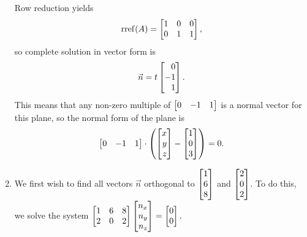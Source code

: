 \begin{exercises}
\begin{problist}
\begin{solution}
\begin{enumerate}
\[					\]
					Row reduction yields
					\[
						\Rref(A) = \mat{1&0&0\\0&1&1},
					\]
					so complete solution in vector form is 
					\[
						\vec n = t\mat{0\\-1\\1}.
					\]
					This means that any non-zero multiple of $\mat{0&-1&1}$ is a normal vector for this plane, so the normal form of the plane is 
					\[
						\mat{0&-1&1} \cdot \left(\mat{x\\y\\z} - \mat{1\\0\\3}\right)=0.
					\]
				\item  We first wish to find all vectors $\vec n$ orthogonal to $\mat{1\\6\\8}$ and $\mat{2\\0\\2}$. 
					To do this, we solve the system 
					$\mat{1&6&8\\2&0&2}\mat{n_x\\n_y\\n_z}=\mat{0\\0}.$


\end{enumerate}
\end{solution}
\end{problist}
\end{exercises}
